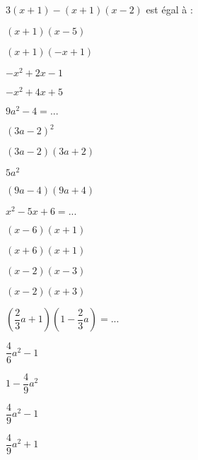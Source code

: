 \begin{QCM}
\begin{GroupeQCM}
    \begin{exercice}
      $3(x+1)-(x+1)(x-2)$ est égal à :
      \begin{ChoixQCM}{4}
      \item $(x+1)(x-5)$
      \item $(x+1)(-x+1)$
      \item $-x^2+2x-1$
      \item $-x^2+4x+5$
      \end{ChoixQCM}
      \begin{corrige}
   \end{corrige}
    \end{exercice}


    \begin{exercice}
      $9a^2-4=...$
      \begin{ChoixQCM}{4}
      \item $(3a-2)^2$
      \item $(3a-2)(3a+2)$
      \item $5a^2$
      \item $(9a-4)(9a+4)$
      \end{ChoixQCM}
      \begin{corrige}
   \end{corrige}
    \end{exercice}
    
    
     \begin{exercice}
      $x^2-5x+6=...$
      \begin{ChoixQCM}{4}
      \item $(x-6)(x+1)$
      \item $(x+6)(x+1)$
      \item $(x-2)(x-3)$
      \item $(x-2)(x+3)$
      \end{ChoixQCM}
      \begin{corrige}
   \end{corrige}
    \end{exercice}
    
     \begin{exercice}
      $\left( \dfrac{2}{3}a+1\right) \left( 1-\dfrac{2}{3}a\right) =...$
      \begin{ChoixQCM}{4}
      \item $\dfrac{4}{6}a^2-1$
      \item $1-\dfrac{4}{9}a^2$
      \item $\dfrac{4}{9}a^2-1$
      \item $\dfrac{4}{9}a^2+1$
      \end{ChoixQCM}
      \begin{corrige}
   \end{corrige}
    \end{exercice}
    

\end{GroupeQCM}
\end{QCM}
